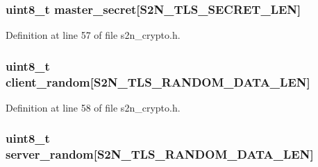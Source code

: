\subsubsection[{\texorpdfstring{master\+\_\+secret}{master_secret}}]{\setlength{\rightskip}{0pt plus 5cm}uint8\+\_\+t master\+\_\+secret\mbox{[}{\bf S2\+N\+\_\+\+T\+L\+S\+\_\+\+S\+E\+C\+R\+E\+T\+\_\+\+L\+EN}\mbox{]}}\hypertarget{structs2n__crypto__parameters_a5fe631e363754e6d6232fcbf54a771a6}{}\label{structs2n__crypto__parameters_a5fe631e363754e6d6232fcbf54a771a6}


Definition at line 57 of file s2n\+\_\+crypto.\+h.

\subsubsection[{\texorpdfstring{client\+\_\+random}{client_random}}]{\setlength{\rightskip}{0pt plus 5cm}uint8\+\_\+t client\+\_\+random\mbox{[}{\bf S2\+N\+\_\+\+T\+L\+S\+\_\+\+R\+A\+N\+D\+O\+M\+\_\+\+D\+A\+T\+A\+\_\+\+L\+EN}\mbox{]}}\hypertarget{structs2n__crypto__parameters_a782eb75227ef443a21bfa5f2eb9d4b7a}{}\label{structs2n__crypto__parameters_a782eb75227ef443a21bfa5f2eb9d4b7a}


Definition at line 58 of file s2n\+\_\+crypto.\+h.

\subsubsection[{\texorpdfstring{server\+\_\+random}{server_random}}]{\setlength{\rightskip}{0pt plus 5cm}uint8\+\_\+t server\+\_\+random\mbox{[}{\bf S2\+N\+\_\+\+T\+L\+S\+\_\+\+R\+A\+N\+D\+O\+M\+\_\+\+D\+A\+T\+A\+\_\+\+L\+EN}\mbox{]}}\hypertarget{structs2n__crypto__parameters_ae6ef2eba6c9afbd8345314a05422a2e4}{}\label{structs2n__crypto__parameters_ae6ef2eba6c9afbd8345314a05422a2e4}


